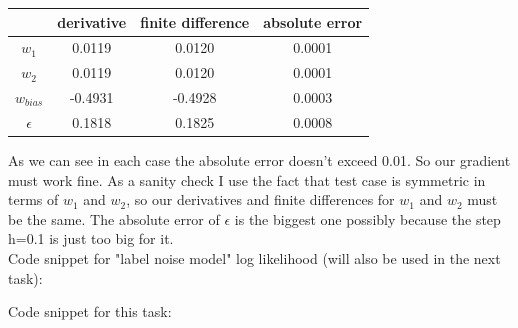 \documentclass{article}
\begin{document}
\begin{enumerate}[label=(\alph*)]
\begin{center}
							\begin{tabular}{| c | c | c | c |}
								\hline
								\, & derivative & finite difference & absolute error \\
								\hline
								$w_{1}$ 	& 0.0119 & 0.0120 & 0.0001 \\
								\hline
								$w_{2}$     & 0.0119 & 0.0120 & 0.0001 \\
								\hline
							    $w_{bias}$ &-0.4931 &-0.4928& 0.0003 \\
							    \hline
							    $\epsilon$ & 0.1818 & 0.1825 & 0.0008 \\
							    \hline
							\end{tabular}
						\end{center}
						As we can see in each case the absolute error doesn't exceed 0.01. So our gradient must work fine. As a sanity check I use the fact that test case is symmetric in terms of $w_{1}$ and $w_{2}$, so our derivatives and finite differences for $w_{1}$ and $w_{2}$ must be the same. The absolute error of $\epsilon$ is the biggest one possibly because the step h=0.1 is just too big for it. \\
						Code snippet for "label noise model" log likelihood (will also be used in the next task):
						
						Code snippet for this task:
						
						

\end{enumerate}
\end{document}
